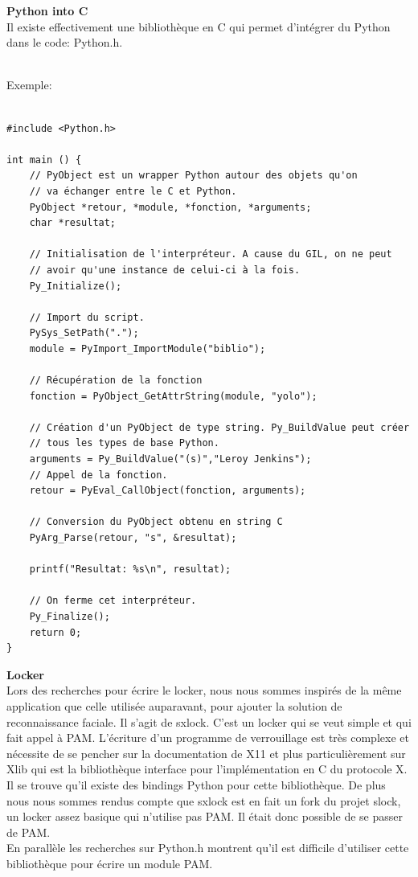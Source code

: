 \documentclass[french]{report}
\begin{document}
  \vspace{0.5cm}

  \textbf{Python into C}\\

  Il existe effectivement une bibliothèque en C qui permet d’intégrer du
  Python dans le code: Python.h.
\\ \\

\newpage

  Exemple:

  \begin{verbatim}

#include <Python.h>

int main () {
    // PyObject est un wrapper Python autour des objets qu'on
    // va échanger entre le C et Python.
    PyObject *retour, *module, *fonction, *arguments;
    char *resultat;

    // Initialisation de l'interpréteur. A cause du GIL, on ne peut
    // avoir qu'une instance de celui-ci à la fois.
    Py_Initialize();

    // Import du script.
    PySys_SetPath(".");
    module = PyImport_ImportModule("biblio");

    // Récupération de la fonction
    fonction = PyObject_GetAttrString(module, "yolo");

    // Création d'un PyObject de type string. Py_BuildValue peut créer
    // tous les types de base Python.
    arguments = Py_BuildValue("(s)","Leroy Jenkins");
    // Appel de la fonction.
    retour = PyEval_CallObject(fonction, arguments);

    // Conversion du PyObject obtenu en string C
    PyArg_Parse(retour, "s", &resultat);

    printf("Resultat: %s\n", resultat);

    // On ferme cet interpréteur.
    Py_Finalize();
    return 0;
}
  \end{verbatim}

  \vspace{0.5cm}

  \textbf{Locker}\\

  Lors des recherches pour écrire le locker, nous nous sommes inspirés de la même
  application que celle utilisée auparavant, pour ajouter la solution de
  reconnaissance faciale. Il s’agit de sxlock. C’est un locker qui se
  veut simple et qui fait appel à PAM. L’écriture d’un programme de
  verrouillage est très complexe et nécessite de se pencher sur la
  documentation de X11 et plus particulièrement sur Xlib qui est la
  bibliothèque interface pour l’implémentation en C du protocole X. Il se
  trouve qu’il existe des bindings Python pour cette bibliothèque. De plus nous
  nous sommes rendus compte que sxlock est en fait un fork du projet slock, un
  locker assez basique qui n’utilise pas PAM. Il était donc possible de se passer de PAM.
\\
  En parallèle les recherches sur Python.h montrent qu’il est difficile
  d’utiliser cette bibliothèque pour écrire un module PAM.
\end{document}
